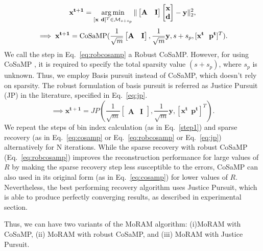 $$
\mathbf{{x}^{t+1}}=\argmin_{[\mathbf{x~d}]^T \in \mathcal{M}_{s+s_p}}\norm{\begin{bmatrix} \mathbf{A} & \mathbf{I} \end{bmatrix} \begin{bmatrix} \mathbf{x} \\ \mathbf{d} \end{bmatrix} - \mathbf{y}}_2^2, %
$$
\begin{equation}
\implies \mathbf{{x^{t+1}}} = \mathrm{CoSaMP}(\frac{1}{\sqrt{m}}\begin{bmatrix} \mathbf{A} & \mathbf{I} \end{bmatrix},\frac{1}{\sqrt{m}}\mathbf{y},s+s_p,[\mathbf{x^t~~p^t}]^T).
\label{eq:robcosamp}
\end{equation}
We call the step in Eq.~\ref{eq:robcosamp} a Robust CoSaMP. 
However, for using CoSaMP , it is required to specify the total sparsity value $(s +s_p)$, where $s_p$ is unknown. Thus, we employ Basis pursuit instead of CoSaMP, which doesn't rely on sparsity. The robust formulation of basis pursuit is referred as Justice Pursuit (JP) in the literature, specified in Eq.~\ref{eq:jp}.
\begin{equation}
\implies \mathbf{{x^{t+1}}} = JP(\frac{1}{\sqrt{m}}\begin{bmatrix} \mathbf{A} & \mathbf{I} \end{bmatrix},\frac{1}{\sqrt{m}}\mathbf{y},[\mathbf{x^t~~p^t}]^T).
\label{eq:jp}
\end{equation}
We repeat the steps of bin index calculation (as in Eq.~\ref{step1}) and sparse recovery (as in Eq.~\ref{eq:cosamp} or Eq.~\ref{eq:robcosamp} or Eq.~\ref{eq:jp}) alternatively for $\mathrm{N}$ iterations. While the sparse recovery with robust CoSaMP (Eq.~\ref{eq:robcosamp}) improves the reconstruction performance for large values of $R$ by making the sparse recovery step less susceptible to the errors, CoSaMP can also used in its original form (as in Eq.~\ref{eq:cosamp}) for lower values of $R$. Nevertheless, the best performing recovery algorithm uses Justice Pursuit, which is able to produce perfectly converging results, as described in experimental section.

Thus, we can have two variants of the MoRAM algorithm: (i)MoRAM with CoSaMP, (ii) MoRAM with robust CoSaMP, and (iii) MoRAM with Justice Pursuit. 


%
